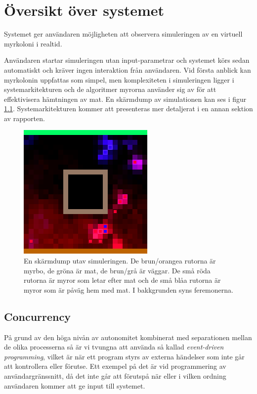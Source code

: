 


\chapter{Översikt över systemet}

\label{Systemet} 


Systemet ger användaren möjligheten att observera simuleringen av en virtuell myrkoloni i realtid.

Användaren startar simuleringen utan input-parametrar och systemet körs sedan automatiskt och kräver ingen interaktion från användaren. 
Vid första anblick kan myrkolonin uppfattas som simpel, men komplexiteten i simuleringen ligger i systemarkitekturen och de algoritmer myrorna använder sig av för att effektivisera hämtningen av mat. En skärmdump av simulationen kan ses i figur \ref{fig:screen}. Systemarkitekturen kommer att presenteras mer detaljerat i en annan sektion av rapporten.

\begin{figure}
\centerline{
\includegraphics[scale=0.8]{Figures/screen.png}}
\caption{En skärmdump utav simuleringen. De brun/orangea rutorna är myrbo, de gröna är mat, de brun/grå är väggar.
De små röda rutorna är myror som letar efter mat och de små blåa rutorna är myror som är påväg hem med mat. I bakkgrunden syns feremonerna.}
\label{fig:screen}


\end{figure}


\section{Concurrency}

På grund av den höga nivån av autonomitet kombinerat med separationen mellan de olika processerna så är vi tvungna att använda så kallad \emph{event-driven programming}, vilket är när ett program styrs av externa händelser som inte går att kontrollera eller förutse. Ett exempel på det är vid programmering av användargränssnitt, då det inte går att förutspå när eller i vilken ordning användaren kommer att ge input till systemet. 


